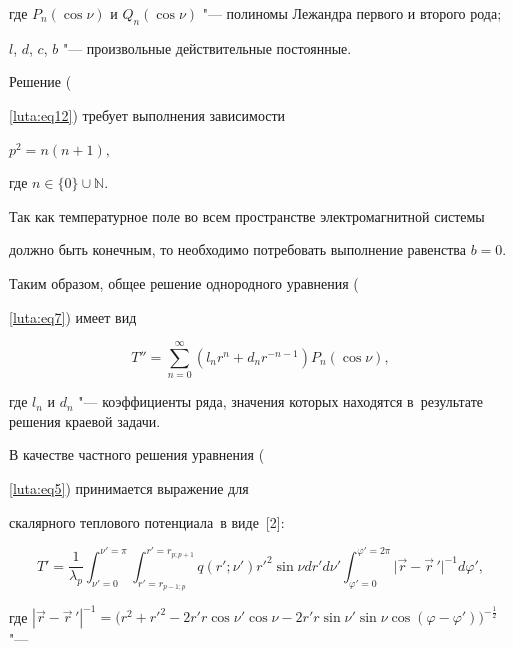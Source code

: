 {{{где $P_n(\cos\nu )$ и $Q_n(\cos\nu )$ "--- полиномы Лежандра первого и второго рода;

$l$, $d$, $c$, $b$ "--- произвольные действительные постоянные.

Решение ({\ref{luta:eq12}) требует выполнения зависимости

$p^{2}=n(n+1),$

где $n \in \{0\}\cup\mathbb N$.



Так как температурное поле во всем пространстве электромагнитной системы

должно быть конечным, то необходимо потребовать выполнение равенства $b = 0$.



Таким образом, общее решение однородного уравнения ({\ref{luta:eq7}) имеет вид

\begin{equation}

\label{luta:eq13}

T''=\sum\limits_{n=0}^\infty

( l_n r^n+d_n r^{-n-1} )P_n (\cos \nu ) ,

\end{equation}

где $l_n$ и $d_n$ "--- коэффициенты ряда, значения которых находятся в~результате решения краевой задачи.



В качестве частного решения уравнения ({\ref{luta:eq5}) принимается выражение для

скалярного теплового потенциала~в виде~[2]:

\begin{equation}

\label{luta:eq14}

T'=\frac1{\lambda _p }

\int_{\nu '=0}^{\nu '=\pi }

\int_{r'=r_{p-1; p} }^{r'=r_{p; p+1} } \!\!\!\!

q(r'; \nu ')r'^2\sin \nu dr' d\nu '

\int_{\varphi '=0}^{\varphi '=2\pi } \!\!\!\!

\bigl| \vec r-\vec r\,' \bigr|^{-1}d\varphi' ,

\end{equation}

где $| \vec r-\vec r\,'|^{-1}=\bigl(r^2+r'^2-2r' r \cos \nu ' \cos \nu -

2r'r \sin \nu '   \sin \nu \cos (\varphi -\varphi ')\bigr)^{-\frac12}$ "---

}}}}}}
